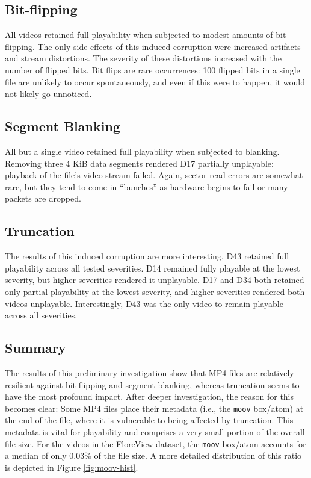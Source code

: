 \subsection{Bit-flipping}

All videos retained full playability when subjected to modest amounts of bit-flipping. The only side effects of this induced corruption were increased artifacts and stream distortions. The severity of these distortions increased with the number of flipped bits. Bit flips are rare occurrences: 100 flipped bits in a single file are unlikely to occur spontaneously, and even if this were to happen, it would not likely go unnoticed.

\subsection{Segment Blanking}

All but a single video retained full playability when subjected to blanking. Removing three 4 KiB data segments rendered D17 partially unplayable: playback of the file's video stream failed. Again, sector read errors are somewhat rare, but they tend to come in ``bunches'' as hardware begins to fail or many packets are dropped.

\subsection{Truncation}

The results of this induced corruption are more interesting. D43 retained full playability across all tested severities. D14 remained fully playable at the lowest severity, but higher severities rendered it unplayable. D17 and D34 both retained only partial playability at the lowest severity, and higher severities rendered both videos unplayable. Interestingly, D43 was the only video to remain playable across all severities.

\subsection{Summary}

The results of this preliminary investigation show that MP4 files are relatively resilient against bit-flipping and segment blanking, whereas truncation seems to have the most profound impact. After deeper investigation, the reason for this becomes clear: Some MP4 files place their metadata (i.e., the \texttt{moov} box/atom) at the end of the file, where it is vulnerable to being affected by truncation. This metadata is vital for playability and comprises a very small portion of the overall file size. For the videos in the FloreView dataset, the \texttt{moov} box/atom accounts for a median of only 0.03\% of the file size. A more detailed distribution of this ratio is depicted in Figure \ref{fig:moov-hist}.

